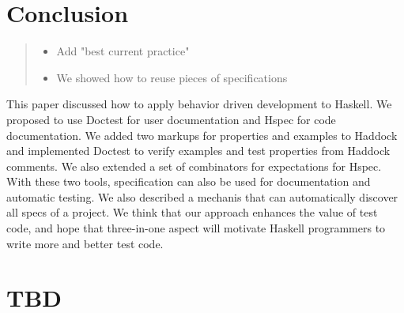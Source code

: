 \documentclass[preprint]{sigplanconf}
\begin{document}
\section{Conclusion}

\begin{quote}
    \begin{itemize}
        \item Add "best current practice"
        \item We showed how to reuse pieces of specifications
    \end{itemize}
\end{quote}

This paper discussed how to apply behavior driven development to
Haskell.  We proposed to use Doctest for user documentation and Hspec
for code documentation. We added two markups for
properties and examples to Haddock and implemented
Doctest to verify examples and test properties from Haddock comments.
We also extended a set of combinators for expectations for Hspec.
With these two tools, specification can also be
used for documentation and automatic testing.  We also described a
mechanis that can automatically discover all specs of a project.  We
think that our approach enhances the value of test code, and hope
that three-in-one aspect will motivate Haskell programmers to write
more and better test code.

\appendix
\section{TBD}
\end{document}
